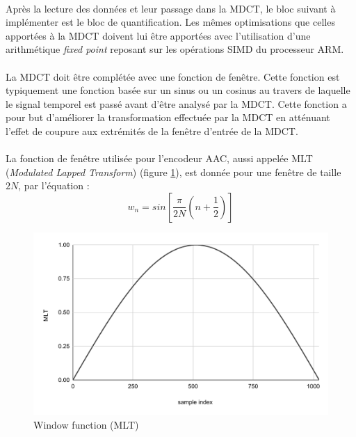\documentclass{article}
\begin{document}
    \paragraph{}
    Après la lecture des données et leur passage dans la MDCT, le bloc suivant à implémenter est le bloc de quantification. Les mêmes optimisations que celles apportées à la MDCT doivent lui être apportées avec l'utilisation d'une arithmétique \emph{fixed point} reposant sur les opérations SIMD du processeur ARM.

    \paragraph{}
    La MDCT doit être complétée avec une fonction de fenêtre. Cette fonction est typiquement une fonction basée sur un sinus ou un cosinus au travers de laquelle le signal temporel est passé avant d'être analysé par la MDCT. Cette fonction a pour but d'améliorer la transformation effectuée par la MDCT en atténuant l'effet de coupure aux extrémités de la fenêtre d'entrée de la MDCT.

    \paragraph{}
    La fonction de fenêtre utilisée pour l'encodeur AAC, aussi appelée MLT (\emph{Modulated Lapped Transform}) (figure \ref{fig:mlt}), est donnée pour une fenêtre de taille $2N$, par l'équation :
    $$w_n = sin\left[ \frac{\pi}{2N} \left( n + \frac{1}{2} \right) \right]$$
    \begin{figure}[H]
        \centering
        \includegraphics[width=.8\linewidth]{./images/mlt.pdf}
        \caption{Window function (MLT)}
        \label{fig:mlt}
    \end{figure}
\end{document}
